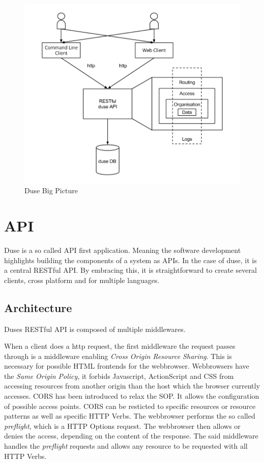 \begin{figure}
  \includegraphics[scale=0.55]{pictures/big_picture.png}
  \caption{Duse Big Picture}
  \centering
  \label{fig:big_picture}
\end{figure}

\section{API}

Duse is a so called API first application. Meaning the software development
highlights building the components of a system as APIs. In the case of duse, it
is a central RESTful API. By embracing this, it is straightforward to create
several clients, cross platform and for multiple languages.

\subsection{Architecture}

Duses RESTful API is composed of multiple middlewares.

When a client does a http request, the first middleware the request passes
through is a middleware enabling \textit{Cross Origin Resource Sharing}. This
is necessary for possible HTML frontends for the webbrowser. Webbrowsers have
the \textit{Same Origin Policy}, it forbids Javascript, ActionScript and CSS
from accessing resources from another origin than the host which the browser
currently accesses. CORS has been introduced to relax the SOP. It allows the
configuration of possible access points. CORS can be resticted to specific
resources or resource patterns as well as specific HTTP Verbs. The webbrowser
performs the so called \textit{preflight}, which is a HTTP Options request. The
webbrowser then allows or denies the access, depending on the content of the
response. The said middleware handles the \textit{preflight} requests and
allows any resource to be requested with all HTTP Verbs.

